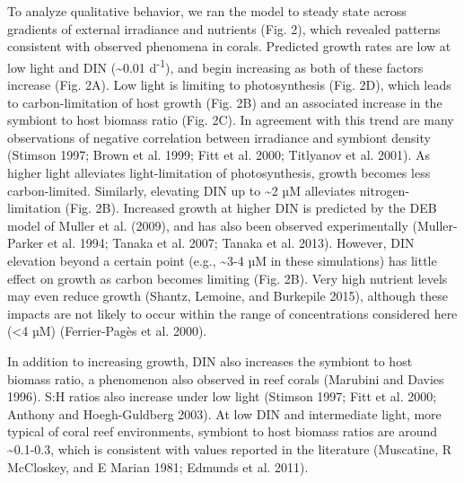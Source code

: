 \documentclass[]{elsarticle} %
\begin{document}
To analyze qualitative behavior, we ran the model to steady state across
gradients of external irradiance and nutrients (Fig. 2), which revealed
patterns consistent with observed phenomena in corals. Predicted growth
rates are low at low light and DIN (\textasciitilde{}0.01
d\textsuperscript{-1}), and begin increasing as both of these factors
increase (Fig. 2A). Low light is limiting to photosynthesis (Fig. 2D),
which leads to carbon-limitation of host growth (Fig. 2B) and an
associated increase in the symbiont to host biomass ratio (Fig. 2C). In
agreement with this trend are many observations of negative correlation
between irradiance and symbiont density (Stimson 1997; Brown et al.
1999; Fitt et al. 2000; Titlyanov et al. 2001). As higher light
alleviates light-limitation of photosynthesis, growth becomes less
carbon-limited. Similarly, elevating DIN up to \textasciitilde{}2 µM
alleviates nitrogen-limitation (Fig. 2B). Increased growth at higher DIN
is predicted by the DEB model of Muller et al. (2009), and has also been
observed experimentally (Muller-Parker et al. 1994; Tanaka et al. 2007;
Tanaka et al. 2013). However, DIN elevation beyond a certain point
(e.g., \textasciitilde{}3-4 µM in these simulations) has little effect
on growth as carbon becomes limiting (Fig. 2B). Very high nutrient
levels may even reduce growth (Shantz, Lemoine, and Burkepile 2015),
although these impacts are not likely to occur within the range of
concentrations considered here (\textless{}4 µM) (Ferrier-Pagès et al.
2000).

In addition to increasing growth, DIN also increases the symbiont to
host biomass ratio, a phenomenon also observed in reef corals (Marubini
and Davies 1996). S:H ratios also increase under low light (Stimson
1997; Fitt et al. 2000; Anthony and Hoegh-Guldberg 2003). At low DIN and
intermediate light, more typical of coral reef environments, symbiont to
host biomass ratios are around \textasciitilde{}0.1-0.3, which is
consistent with values reported in the literature (Muscatine, R
McCloskey, and E Marian 1981; Edmunds et al. 2011).
\end{document}
